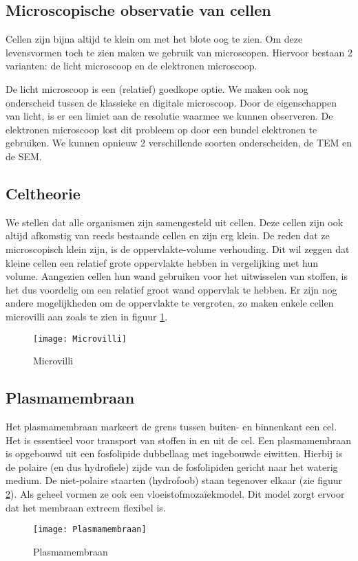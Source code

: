 \documentclass[a4paper,kul]{kulakarticle} %
\begin{document}
\subsection{Microscopische observatie van cellen}
Cellen zijn bijna altijd te klein om met het blote oog te zien. Om deze levensvormen toch te zien maken we gebruik van microscopen. Hiervoor bestaan 2 varianten: de licht microscoop en de elektronen microscoop. 

De licht microscoop is een (relatief) goedkope optie. We maken ook nog onderscheid tussen de klassieke en digitale microscoop. Door de eigenschappen van licht, is er een limiet aan de resolutie waarmee we kunnen observeren. De elektronen microscoop lost dit probleem op door een bundel elektronen te gebruiken. We kunnen opnieuw 2 verschillende soorten onderscheiden, de TEM en de SEM. 
\subsection{Celtheorie}
We stellen dat alle organismen zijn samengesteld uit cellen. Deze cellen zijn ook altijd afkomstig van reeds bestaande cellen en zijn erg klein. De reden dat ze microscopisch klein zijn, is de oppervlakte-volume verhouding. Dit wil zeggen dat kleine cellen een relatief grote oppervlakte hebben in vergelijking met hun volume. Aangezien cellen hun wand gebruiken voor het uitwisselen van stoffen, is het dus voordelig om een relatief groot wand oppervlak te hebben. Er zijn nog andere mogelijkheden om de oppervlakte te vergroten, zo maken enkele cellen microvilli aan zoals te zien in figuur \ref{fig:microvilli}.
\begin{figure}[h]
	\centering
	\texttt{[image: Microvilli]}
	\caption[Microvilli]{Microvilli}
	\label{fig:microvilli}
\end{figure}
\newpage
\subsection{Plasmamembraan}
Het plasmamembraan markeert de grens tussen buiten- en binnenkant een cel. Het is essentieel voor transport van stoffen in en uit de cel. Een plasmamembraan is opgebouwd uit een fosfolipide dubbellaag met ingebouwde eiwitten. Hierbij is de polaire (en dus hydrofiele) zijde van de fosfolipiden gericht naar het waterig medium. De niet-polaire staarten (hydrofoob) staan tegenover elkaar (zie figuur \ref{fig:plasmamembraan}). Als geheel vormen ze ook een vloeistofmozaïekmodel. Dit model zorgt ervoor dat het membraan extreem flexibel is. 
\begin{figure}[h]
	\centering
	\texttt{[image: Plasmamembraan]}
	\caption[Plasmamembraan]{Plasmamembraan}
	\label{fig:plasmamembraan}
\end{figure}
\end{document}
